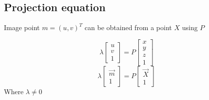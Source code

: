 \subsection{Projection equation}

Image point $m = (u, v)^T$ can be obtained from a point $X$ using $P$ 

$$
\lambda \begin{bmatrix} 
    u \\ v \\ 1 \end{bmatrix} = P \begin{bmatrix} x \\ y \\ z \\ 1
\end{bmatrix}
$$
$$
\lambda \begin{bmatrix} 
    \vec{m} \\ 1 \end{bmatrix} = P \begin{bmatrix} \vec{X} \\ 1
    \end{bmatrix}
$$
Where $\lambda \neq 0$
